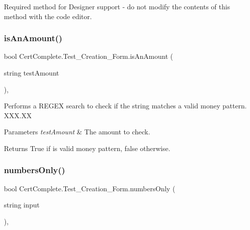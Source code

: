 Required method for Designer support -\/ do not modify the contents of this method with the code editor. 

\mbox{\label{class_cert_complete_1_1_test___creation___form_a649494ce93fde6175d11beca3d442156}} 
\subsubsection{\texorpdfstring{is\+An\+Amount()}{isAnAmount()}}
{\footnotesize\ttfamily bool Cert\+Complete.\+Test\+\_\+\+Creation\+\_\+\+Form.\+is\+An\+Amount (\begin{DoxyParamCaption}\item[{string}]{test\+Amount }\end{DoxyParamCaption})\hspace{0.3cm}{\ttfamily [inline]}, {\ttfamily [private]}}



Performs a R\+E\+G\+EX search to check if the string matches a valid money pattern. X\+X\+X.\+XX 


\begin{DoxyParams}{Parameters}
{\em test\+Amount} & The amount to check.\\
\hline
\end{DoxyParams}
\begin{DoxyReturn}{Returns}
True if is valid money pattern, false otherwise.
\end{DoxyReturn}
\mbox{\label{class_cert_complete_1_1_test___creation___form_a821663f4d5be3f2940132b2fc68eb681}} 
\subsubsection{\texorpdfstring{numbers\+Only()}{numbersOnly()}}
{\footnotesize\ttfamily bool Cert\+Complete.\+Test\+\_\+\+Creation\+\_\+\+Form.\+numbers\+Only (\begin{DoxyParamCaption}\item[{string}]{input }\end{DoxyParamCaption})\hspace{0.3cm}{\ttfamily [inline]}, {\ttfamily [private]}}



